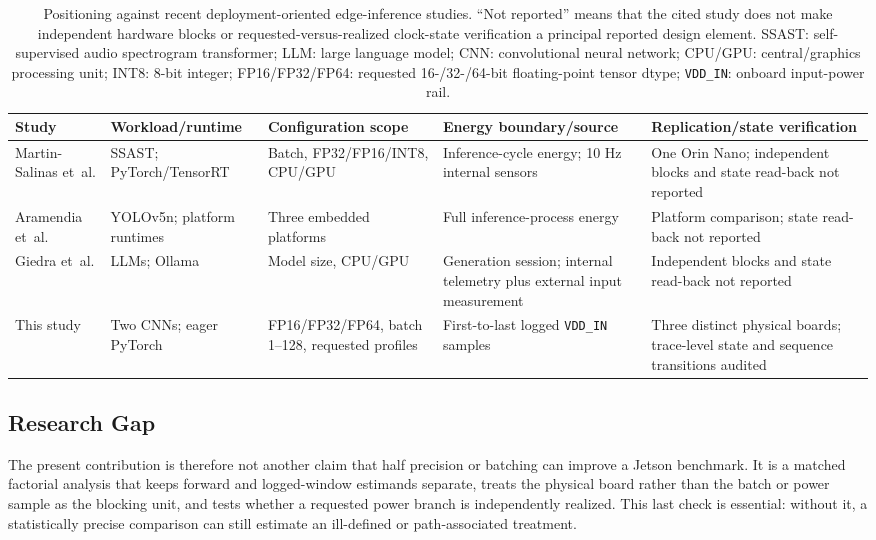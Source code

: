 \documentclass[electronics,article,submit,pdftex,moreauthors]{Definitions/mdpi}
\newcommand{\etal}{et~al.}
\begin{document}
\begin{table}[t]
\caption{Positioning against recent deployment-oriented edge-inference studies. ``Not reported'' means that the cited study does not make independent hardware blocks or requested-versus-realized clock-state verification a principal reported design element. SSAST: self-supervised audio spectrogram transformer; LLM: large language model; CNN: convolutional neural network; CPU/GPU: central/graphics processing unit; INT8: 8-bit integer; FP16/FP32/FP64: requested 16-/32-/64-bit floating-point tensor dtype; \texttt{VDD\_IN}: onboard input-power rail.}
\label{tab:related-comparison}
\centering
\small
\setlength{\tabcolsep}{2pt}
\begin{tabularx}{\textwidth}{>{\raggedright\arraybackslash}p{22mm}>{\raggedright\arraybackslash}p{27mm}>{\raggedright\arraybackslash}p{30mm}>{\raggedright\arraybackslash}X>{\raggedright\arraybackslash}p{36mm}}
\toprule
Study & Workload/runtime & Configuration scope & Energy boundary/source & Replication/state verification \\
\midrule
Martin-Salinas \etal{} \cite{martinsalinas2025} & SSAST; PyTorch/TensorRT & Batch, FP32/FP16/INT8, CPU/GPU & Inference-cycle energy; 10 Hz internal sensors & One Orin Nano; independent blocks and state read-back not reported \\
Aramendia \etal{} \cite{aramendia2025} & YOLOv5n; platform runtimes & Three embedded platforms & Full inference-process energy & Platform comparison; state read-back not reported \\
Giedra \etal{} \cite{giedra2026} & 12 LLMs; Ollama & Model size, CPU/GPU & Generation session; internal telemetry plus external input measurement & Independent blocks and state read-back not reported \\
This study & Two CNNs; eager PyTorch & FP16/FP32/FP64, batch 1--128, requested profiles & First-to-last logged \texttt{VDD\_IN} samples & Three distinct physical boards; trace-level state and sequence transitions audited \\
\bottomrule
\end{tabularx}
\end{table}

\subsection{Research Gap}

The present contribution is therefore not another claim that half precision or batching can improve a Jetson benchmark. It is a matched factorial analysis that keeps forward and logged-window estimands separate, treats the physical board rather than the batch or power sample as the blocking unit, and tests whether a requested power branch is independently realized. This last check is essential: without it, a statistically precise comparison can still estimate an ill-defined or path-associated treatment.
\end{document}

